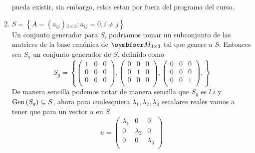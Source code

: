 \begin{enumerate}[label=\listAlph]
            pueda existir, sin embargo, estos estan por fuera del programa del curso.
        \setcounter{enumii}{4}
        \item \(S = \left\{A = \left(a_{ij}\right){}_{3 \times 3}: a_{ij} = 0, i \neq j\right\}\) \\
            Un conjunto generador para \(S\), podriamos tomar un subconjunto de las matrices de la base canónica de \(\fm_{3 \times 3}\)
            tal que genere a \(S\). Entonces sea \(S_g\) un conjunto generador de \(S\), definido como
            \[
                S_g =
                \left\{
                    \begin{pmatrix}
                        1 & 0 & 0 \\
                        0 & 0 & 0 \\
                        0 & 0 & 0 \\
                    \end{pmatrix},
                    \begin{pmatrix}
                        0 & 0 & 0 \\
                        0 & 1 & 0 \\
                        0 & 0 & 0 \\
                    \end{pmatrix},
                    \begin{pmatrix}
                        0 & 0 & 0 \\
                        0 & 0 & 0 \\
                        0 & 0 & 1 \\
                    \end{pmatrix},
                \right\}
            \]
            De manera sencilla podemos notar de manera sencilla que \(S_g\) es \(l.i\) y \(\text{Gen} \left( S_g \right) \subseteq S\), ahora para cualesquiera \(\lambda_1, \lambda_2, \lambda_3\)
            escalares reales vamos a tener que para un vector \(u\) en \(S\)
            \[
                u = 
                \begin{pmatrix}
                    \lambda_1 & 0 & 0 \\
                    0 & \lambda_2 & 0 \\
                    0 & 0 & \lambda_3 \\

\end{pmatrix}\]
\end{enumerate}
